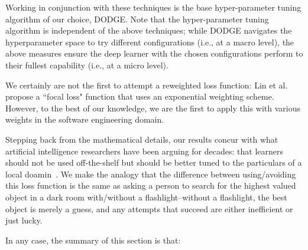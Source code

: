 \documentclass[10pt,compsoc,twocolumn]{IEEEtran}
\begin{document}
Working in conjunction with these techniques is the base hyper-parameter tuning algorithm of our choice, DODGE. Note that the hyper-parameter tuning algorithm is independent of the above techniques; while DODGE navigates the hyperparameter space to try different configurations (i.e., at a macro level), the above measures ensure the deep learner with the chosen configurations perform to their fullest capability (i.e., at a micro level).




We certainly are not the first to attempt a reweighted loss function: Lin et al.~\cite{lin2017focal} propose a ``focal loss" function that uses an exponential weighting scheme. However, to the best of our knowledge, we are the first to apply this with various weights in the software engineering domain.

Stepping back from the mathematical details,
our results concur with what artificial intelligence researchers have been arguing for decades: that learners should not be used off-the-shelf but should be better tuned to the particulars of a local doamin~\cite{Binkley:2018,fu2016tuning,agrawal2018better,tantithamthavorn2016automated,Novielli:2018}.  We make the analogy that the difference between using/avoiding   this loss function   is the same as asking a person to search for the highest valued object in a dark room with/without a flashlight--without a flashlight, the best object is merely a guess, and any attempts that succeed are either inefficient or just lucky.

In any case, the summary of this section is that:
\end{document}
